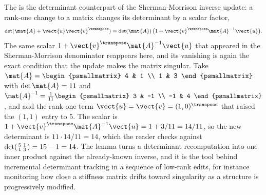 \begin{example}
The  is the determinant counterpart of
the Sherman-Morrison inverse update: a rank-one change to a matrix
changes its determinant by a scalar factor,
\[
\det(\mat{A} + \vect{u}\vect{v}^{\transpose}) = \det(\mat{A})\,
\bigl(1 + \vect{v}^{\transpose}\mat{A}^{-1}\vect{u}\bigr).
\]
The same scalar $1 + \vect{v}^{\transpose}\mat{A}^{-1}\vect{u}$ that
appeared in the Sherman-Morrison denominator reappears here, and its
vanishing is again the exact condition that the update makes the matrix
singular. Take $\mat{A} = \begin{psmallmatrix} 4 & 1 \\ 1 & 3
\end{psmallmatrix}$ with $\det\mat{A} = 11$ and $\mat{A}^{-1} =
\tfrac{1}{11}\begin{psmallmatrix} 3 & -1 \\ -1 & 4 \end{psmallmatrix}$,
and add the rank-one term $\vect{u} = \vect{v} = (1, 0)^{\transpose}$
that raised the $(1,1)$ entry to $5$. The scalar is $1 + \vect{v}^{
\transpose}\mat{A}^{-1}\vect{u} = 1 + 3/11 = 14/11$, so the new
determinant is $11 \cdot 14/11 = 14$, which the reader checks against
$\det\begin{psmallmatrix} 5 & 1 \\ 1 & 3 \end{psmallmatrix} = 15 - 1 =
14$. The lemma turns a determinant recomputation into one inner product
against the already-known inverse, and it is the tool behind incremental
determinant tracking in a sequence of low-rank edits, for instance
monitoring how close a stiffness matrix drifts toward singularity as a
structure is progressively modified.
\end{example}

